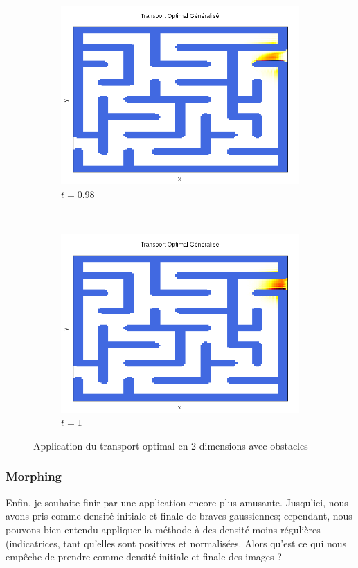 \documentclass[a4paper,12pt]{article}
\begin{document}
\begin{figure}[!h]
\begin{subfigure}[b]{0.23\linewidth}
\includegraphics[width=\linewidth]{img/2DLabyrinthe/T_00099.png}
\caption*{$t=0.98$}
\end{subfigure}
~
\begin{subfigure}[b]{0.23\linewidth}
\includegraphics[width=\linewidth]{img/2DLabyrinthe/T_00101.png}
\caption*{$t=1$}
\end{subfigure}
\caption{Application du transport optimal en 2 dimensions avec obstacles}
\end{figure}



\newpage
\subsubsection{Morphing}
Enfin, je souhaite finir par une application encore plus amusante. Jusqu'ici, nous avons pris comme densité initiale et finale de braves gaussiennes; cependant, nous pouvons bien entendu appliquer la méthode à des densité moins régulières (indicatrices, tant qu'elles sont positives et normalisées. Alors qu'est ce qui nous empêche de prendre comme densité initiale et finale des images ?
\end{document}
